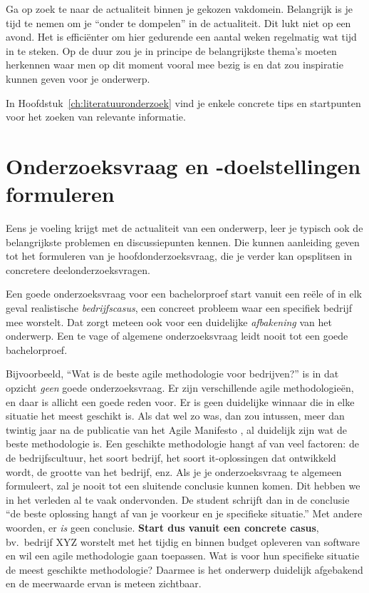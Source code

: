 Ga op zoek te naar de actualiteit binnen je gekozen vakdomein. Belangrijk is je tijd te nemen om je ``onder te dompelen'' in de actualiteit. Dit lukt niet op een avond. Het is efficiënter om hier gedurende een aantal weken regelmatig wat tijd in te steken. Op de duur zou je in principe de belangrijkste thema's moeten herkennen waar men op dit moment vooral mee bezig is en dat zou inspiratie kunnen geven voor je onderwerp.

In Hoofdstuk~\ref{ch:literatuuronderzoek} vind je enkele concrete tips en startpunten voor het zoeken van relevante informatie.

\section{Onderzoeksvraag en -doelstellingen formuleren}%
\label{sec:onderzoeksvraag_formuleren}

Eens je voeling krijgt met de actualiteit van een onderwerp, leer je typisch ook de belangrijkste problemen en discussiepunten kennen. Die kunnen aanleiding geven tot het formuleren van je hoofdonderzoeksvraag, die je verder kan opsplitsen in concretere deelonderzoeksvragen.

Een goede onderzoeksvraag voor een bachelorproef start vanuit een reële of in elk geval realistische \textit{bedrijfscasus}, een concreet probleem waar een specifiek bedrijf mee worstelt. Dat zorgt meteen ook voor een duidelijke \textit{afbakening} van het onderwerp. Een te vage of algemene onderzoeksvraag leidt nooit tot een goede bachelorproef.

Bijvoorbeeld, ``Wat is de beste agile methodologie voor bedrijven?'' is in dat opzicht \textit{geen} goede onderzoeksvraag. Er zijn verschillende agile methodologieën, en daar is allicht een goede reden voor. Er is geen duidelijke winnaar die in elke situatie het meest geschikt is. Als dat wel zo was, dan zou intussen, meer dan twintig jaar na de publicatie van het Agile Manifesto \autocite{BeckEtAl2001}, al duidelijk zijn wat de beste methodologie is. Een geschikte methodologie hangt af van veel factoren: de de bedrijfscultuur, het soort bedrijf, het soort it-oplossingen dat ontwikkeld wordt, de grootte van het bedrijf, enz. Als je je onderzoeksvraag te algemeen formuleert, zal je nooit tot een sluitende conclusie kunnen komen. Dit hebben we in het verleden al te vaak ondervonden. De student schrijft dan in de conclusie ``de beste oplossing hangt af van je voorkeur en je specifieke situatie.'' Met andere woorden, er \textit{is} geen conclusie. \textbf{Start dus vanuit een concrete casus}, bv.\ bedrijf XYZ worstelt met het tijdig en binnen budget opleveren van software en wil een agile methodologie gaan toepassen. Wat is voor hun specifieke situatie de meest geschikte methodologie? Daarmee is het onderwerp duidelijk afgebakend en de meerwaarde ervan is meteen zichtbaar.

